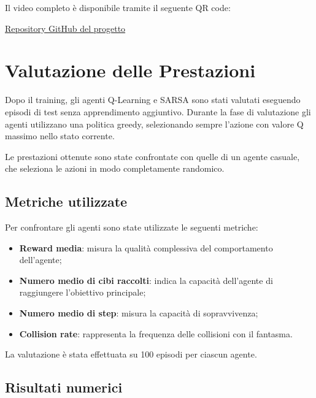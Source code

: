 \documentclass[12pt,a4paper]{report}
\begin{document}
Il video completo è disponibile tramite il seguente QR code:

\begin{center}
\end{center}

\begin{center}
\href{https://github.com/ludovicap/Intelligent-Systems-for-robotics}{Repository GitHub del progetto}
\end{center}

\chapter{Valutazione delle Prestazioni}

Dopo il training, gli agenti Q-Learning e SARSA sono stati valutati eseguendo episodi di test senza apprendimento aggiuntivo. Durante la fase di valutazione gli agenti utilizzano una politica greedy, selezionando sempre l’azione con valore Q massimo nello stato corrente.

Le prestazioni ottenute sono state confrontate con quelle di un agente casuale, che seleziona le azioni in modo completamente randomico.

\section{Metriche utilizzate}

Per confrontare gli agenti sono state utilizzate le seguenti metriche:

\begin{itemize}
    \item \textbf{Reward media}: misura la qualità complessiva del comportamento dell’agente;
    \item \textbf{Numero medio di cibi raccolti}: indica la capacità dell’agente di raggiungere l’obiettivo principale;
    \item \textbf{Numero medio di step}: misura la capacità di sopravvivenza;
    \item \textbf{Collision rate}: rappresenta la frequenza delle collisioni con il fantasma.
\end{itemize}

La valutazione è stata effettuata su 100 episodi per ciascun agente.

\section{Risultati numerici}
\end{document}
